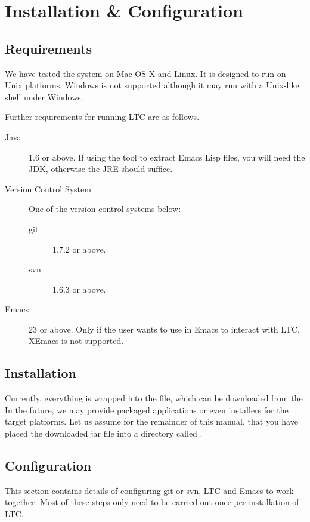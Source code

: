 \chapter{Installation \& Configuration} \label{ch:install}

\section{Requirements}

We have tested the system on Mac OS X and Linux. It is designed to run on Unix platforms. Windows is not supported although it may run with a Unix-like shell under Windows.

Further requirements for running LTC are as follows.
\begin{description}
\item[Java] 1.6 or above.  If using the  tool to extract Emacs Lisp files, you will need the JDK, otherwise the JRE should suffice.
\item[Version Control System]  One of the version control systems below:
  \begin{description}
  \item[git] 1.7.2 or above.
  \item[svn] 1.6.3 or above.
  \end{description}
\item[Emacs] 23 or above.  Only if the user wants to use  in Emacs to interact with LTC.  XEmacs is not supported.
\end{description}

\section{Installation}

Currently, everything is wrapped into the  file, which can be downloaded from the   In the future, we may provide packaged applications or even installers for the target platforms.  Let us assume for the remainder of this manual, that you have placed the downloaded jar file into a directory called . 

\section{Configuration}

This section contains details of configuring git or svn, LTC and Emacs to work together.  Most of these steps only need to be carried out once per installation of LTC.


